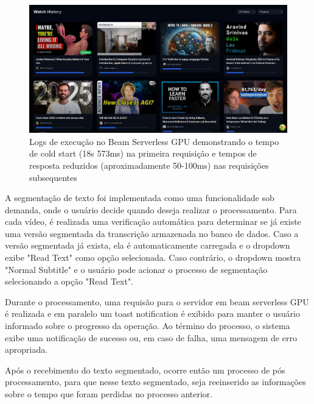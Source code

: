 \documentclass[tcc,capa]{texufpel}
\begin{document}
\begin{figure}[H]
  \centering
  \includegraphics[width=\textwidth,height=0.45\textheight,keepaspectratio]{exemplo-slides/graphics/images/watch history.png}
  \caption{Logs de execução no Beam Serverless GPU demonstrando o tempo de cold start (18s 573ms) na primeira requisição e tempos de resposta reduzidos (aproximadamente 50-100ms) nas requisições subsequentes}
  \label{fig:Average_encryption_throughput}
\end{figure}








A segmentação de texto foi implementada como uma funcionalidade sob demanda, onde o usuário decide quando deseja realizar o processamento. Para cada vídeo, é realizada uma verificação automática para determinar se já existe uma versão segmentada da transcrição armazenada no banco de dados. Caso a versão segmentada já exista, ela é automaticamente carregada e o dropdown exibe "Read Text" como opção selecionada. Caso contrário, o dropdown mostra "Normal Subtitle" e o usuário pode acionar o processo de segmentação selecionando a opção "Read Text".


Durante o processamento, uma requisão para o servidor em beam serverless GPU é realizada e em paralelo um toast notification é exibido para manter o usuário informado sobre o progresso da operação. Ao término do processo, o sistema exibe uma notificação de sucesso ou, em caso de falha, uma mensagem de erro apropriada.

Após o recebimento do texto segmentado, ocorre então um processo de pós processamento, para que nesse texto segmentado, seja reeinserido as informações sobre o tempo que foram perdidas no processo anterior.
\end{document}
